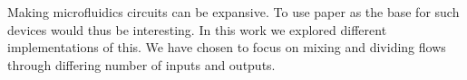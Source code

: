 Making microfluidics circuits can be expansive. To use paper as the base for such devices would thus be interesting. In this work we explored different implementations of this. We have chosen to focus on mixing and dividing flows through differing number of inputs and outputs.